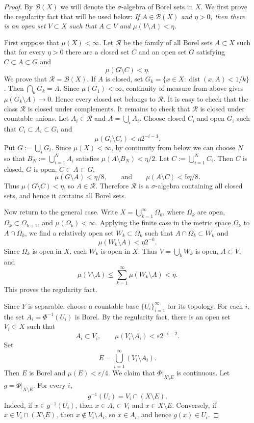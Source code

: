 \documentclass[12pt,leqno]{amsart}
\theoremstyle{definition}
\numberwithin{theorem}{section} \numberwithin{equation}{section}
\begin{document}
\begin{proof}
By $\mathcal{B}(X)$ we will denote the $\sigma$-algebra of Borel sets in $X$.
We first prove the regularity fact that will be used below: {\em If $A\in\mathcal{B}(X)$
and $\eta>0$, then there is an open set $V\subset X$ such that
$A\subset V$ and $\mu(V\setminus A)<\eta$.}

First suppose that $\mu(X)<\infty$. Let $\mathcal R$ be the family of all Borel
sets $A\subset X$ such that for every $\eta>0$ there are a closed set $C$ and an
open set $G$ satisfying $C\subset A\subset G$ and
\[
\mu(G\setminus C)<\eta.
\]
We prove that $\mathcal R=\mathcal B(X)$.
If $A$ is closed, set
$G_k=\{x\in X:\operatorname{dist}(x,A)<1/k\}$. Then $\bigcap_k G_k=A$.
Since $\mu(G_1)<\infty$, continuity of measure from above gives
$\mu(G_k\setminus A)\to 0$. Hence every closed set belongs to $\mathcal R$.
It is easy to check that the class $\mathcal R$ is closed under complements.
It remains to check that $\mathcal R$ is closed under countable unions. Let
$A_i\in\mathcal R$ and $A=\bigcup_i A_i$. Choose closed $C_i$ and open $G_i$
such that $C_i\subset A_i\subset G_i$ and
\[
\mu(G_i\setminus C_i)<\eta 2^{-i-3}.
\]
Put $G:=\bigcup_i G_i$. Since $\mu(X)<\infty$, by continuity from below we can
choose $N$ so that $B_N:=\bigcup_{i=1}^N A_i$ satisfies
$\mu(A\setminus B_N)<\eta/2$.
Let $C:=\bigcup_{i=1}^N C_i$. Then $C$ is closed, $G$ is open,
$C\subset A\subset G$,
\[
\mu(G\setminus A)<\eta/8,
\qquad
\text{and}
\qquad
\mu(A\setminus C)<5\eta/8.
\]
Thus $\mu(G\setminus C)<\eta$, so $A\in\mathcal R$. Therefore $\mathcal R$ is a
$\sigma$-algebra containing all closed sets, and hence it contains all Borel sets.

Now return to the general case. Write $X=\bigcup_{k=1}^\infty \Omega_k$, where
$\Omega_k$ are open, $\Omega_k\subset \Omega_{k+1}$, and $\mu(\Omega_k)<\infty$.
Applying the finite case in the metric space $\Omega_k$ to $A\cap\Omega_k$, we
find a relatively open set $W_k\subset\Omega_k$ such that
$A\cap\Omega_k\subset W_k$ and
\[
\mu(W_k\setminus A)<\eta 2^{-k}.
\]
Since $\Omega_k$ is open in $X$, each $W_k$ is open in $X$. Thus
$V=\bigcup_k W_k$ is open, $A\subset V$, and
\[
\mu(V\setminus A)\leq \sum_{k=1}^\infty \mu(W_k\setminus A)<\eta.
\]
This proves the regularity fact.

Since $Y$ is separable, choose a countable base $\{U_i\}_{i=1}^\infty$ for its
topology. For each $i$, the set $A_i=\Phi^{-1}(U_i)$ is Borel. By the regularity fact,
there is an open set $V_i\subset X$ such that
\[
A_i\subset V_i,\qquad \mu(V_i\setminus A_i)<\varepsilon 2^{-i-2}.
\]
Set
\[
E=\bigcup_{i=1}^\infty (V_i\setminus A_i).
\]
Then $E$ is Borel and $\mu(E)<\varepsilon/4$. We claim that $\Phi|_{X\setminus E}$
is continuous. Let $g=\Phi|_{X\setminus E}$. For every $i$,
\[
g^{-1}(U_i)=V_i\cap (X\setminus E).
\]
Indeed, if $x\in g^{-1}(U_i)$, then $x\in A_i\subset V_i$ and $x\in X\setminus E$.
Conversely, if $x\in V_i\cap (X\setminus E)$, then $x\notin V_i\setminus A_i$,
so $x\in A_i$, and hence $g(x)\in U_i$.


\end{proof}
\end{document}
